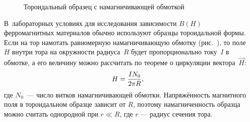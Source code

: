 

\label{sec:toroid-measure}

\begin{wrapfigure}[14]{o}{0.3\textwidth}
    \centering
    \caption{Тороидальный образец с намагничивающей обмоткой}
\end{wrapfigure}

В~лабораторных условиях для исследования зависимости $B(H)$ ферромагнитных
материалов обычно используют образцы тороидальной формы. Если на тор намотать
равномерную намагничивающую обмотку (рис.~), то поле~$H$ внутри
тора на окружности радиуса~$R$ будет пропорционально току~$I$ в обмотке, а его
величину можно рассчитать по теореме о циркуляции вектора~$\vec{H}$:
\begin{equation}
    \eqmark{H-toroid}
    H = \frac{IN_0}{2\pi R},
\end{equation}
где $N_0$~--- число витков намагничивающей обмотки. Напряжённость магнитного
поля в тороидальном образце зависит от $R$, поэтому
намагниченность образца можно считать однородной при $r \ll R$, где $r$ ---
радиус сечения тора.


